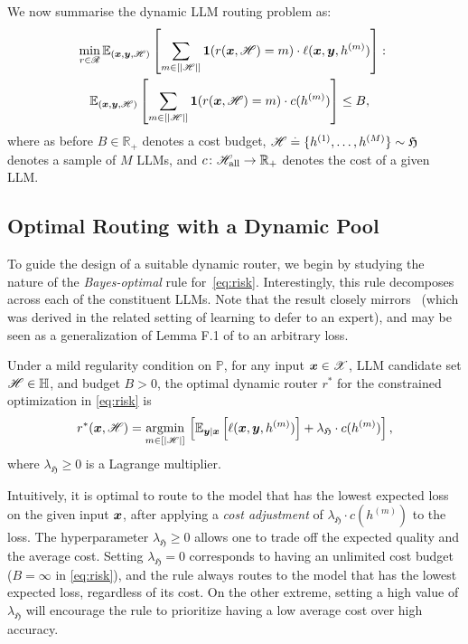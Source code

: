 We now summarise the dynamic LLM routing problem as:
\begin{align}
    \nonumber
    \min_{r \in \mathscr{R}} &\thinspace \mathbb{E}_{(\bx, \by, \mset)}\left[\sum_{m\in[|\mset|]} \1( r( \bx, \mset ) = m ) \cdot \ell(\bx,\by,h^{(m)}) \right] \colon \\
    &\thinspace 
    \hspace{-10pt}
    \mathbb{E}_{(\bx, \by, \mset)}\left[\sum_{m\in[|\mset|]} \1( r( \bx, \mset ) = m ) \cdot c( h^{(m)} ) \right] \le B,
    \label{eq:risk}
\end{align}
where 
as before $B \in \mathbb{R}_{+}$ denotes a cost budget,
$\mathscr{H} \stackrel{.}{=} \{ h^{(1)}, \ldots, h^{(M)} \} \sim \mathfrak{H}$ denotes a sample of $M$ LLMs,  
and $c \colon \mathscr{H}_{\rm all} \to \mathbb{R}_+$ denotes the cost of a given LLM.



\subsection{Optimal Routing with a Dynamic Pool}

To guide the design of a suitable dynamic router, 
we begin by studying the nature of the \emph{Bayes-optimal} rule for~\eqref{eq:risk}.
Interestingly, this rule decomposes across each of the constituent LLMs.
Note that the result closely mirrors~\citet[Eq.\ 6]{Tailor:2024} (which was derived in the related setting of learning to defer to an expert),
and may be seen as a generalization of Lemma F.1 of \citet{Jitkrittum:2023} to an arbitrary loss.

\begin{prop}
\label{prop:optimal_rule} 
Under a mild regularity condition on $\mathbb{P}$,
for any 
input
$\boldsymbol{x} \in \mathscr{X}$,
LLM candidate set $\mathscr{H} \in \mathbb{H}$,
and budget $B > 0$,
the optimal dynamic router $r^{*}$ for the constrained optimization
in \eqref{eq:risk} is
\begin{equation}
\label{eq:opt_rule}
r^{*}(\boldsymbol{x}, \mathscr{H}) = \underset{m\in[ | \mathscr{H} | ]}{\operatorname{argmin}} \, \left[ \mathbb{E}_{\boldsymbol{y}\mid\boldsymbol{x}}\left[\ell(\boldsymbol{x},\boldsymbol{y},h^{(m)})\right]+\lambda_{\mathfrak{H}} \cdot c( h^{(m)} ) \right],
\end{equation}
where $\lambda_{\mathfrak{H}} \ge 0$ is a Lagrange multiplier.
\end{prop}



Intuitively, 
it is optimal to route to the model that has the lowest expected loss
on the given input $\boldsymbol{x}$, 
after applying a \emph{cost adjustment} 
of $\lambda_{\mathfrak{H}} \cdot c( h^{(m)} )$ to the loss.
The hyperparameter $\lambda_{\mathfrak{H}} \ge0$
allows one to trade off the expected quality and the average cost.
Setting $\lambda_{\mathfrak{H}} =0$ corresponds to having an unlimited cost budget
($B=\infty$ in \eqref{eq:risk}), and the rule always routes to the
model that has the lowest expected loss, regardless of its cost. On
the other extreme, setting a high value of $\lambda_{\mathfrak{H}} $ will encourage
the rule to prioritize having a low average cost over high accuracy. 

